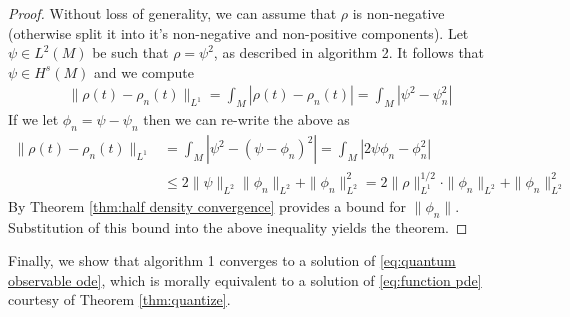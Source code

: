\documentclass[final,leqno]{siamltex1213}
\begin{document}
\begin{proof}
	Without loss of generality, we can assume that $\rho$ is non-negative (otherwise split it into it's non-negative and non-positive components).
	Let $\psi \in L^{2}(M)$ be such that $\rho =  \psi ^{2}$, as described in algorithm 2.
	It follows that $\psi \in H^{s}(M)$ and we compute
	\begin{align}
		\| \rho(t) - \rho_{n}(t) \|_{L^{1}} = \int_{M} | \rho(t) - \rho_{n}(t)| = \int_{M} | \psi^{2} - \psi_{n}^{2} |
	\end{align}
	If we let $\phi_{n} = \psi - \psi_{n}$ then we can re-write the above as
	\begin{align}
		\| \rho(t) - \rho_{n}(t) \|_{L^{1}}  &= \int_{M} | \psi^{2} - (\psi - \phi_{n})^{2} | = \int_{M} | 2 \psi \phi_{n} - \phi_{n}^{2} | \\
			&\leq 2 \| \psi \|_{L^{2}} \| \phi_{n}\|_{L^{2}} + \| \phi_{n} \|_{L^{2}}^{2} = 2 \| \rho \|_{L^{1}}^{1/2} \cdot \| \phi_{n} \|_{L^{2}} + \| \phi_{n} \|_{L^{2}}^{2}
	\end{align}
	By Theorem \ref{thm:half density convergence} provides a bound for $\| \phi_{n} \|$.
	Substitution of this bound into the above inequality yields the theorem.
\end{proof}

Finally, we show that algorithm 1 converges to a solution of \eqref{eq:quantum observable ode}, which is morally equivalent to a solution
of \eqref{eq:function pde} courtesy of Theorem \ref{thm:quantize}.
\end{document}
